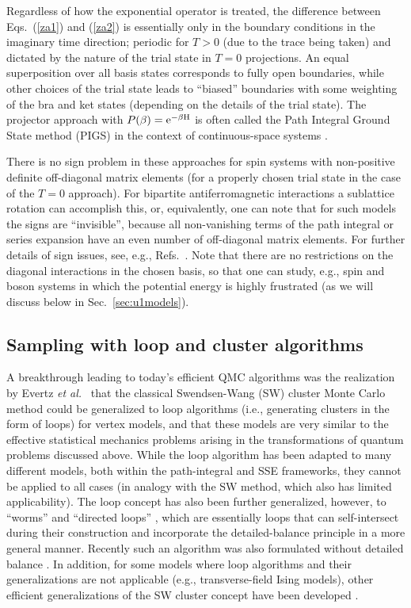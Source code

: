 \documentclass[10pt,pre,aps,twocolumn,showpacs,superscriptaddress,floatfix]{revtex4-1}
\begin{document}
Regardless of how the exponential operator is treated, the difference between Eqs.~(\ref{za1}) and (\ref{za2}) is essentially only in the boundary 
conditions in the imaginary time direction; periodic for $T>0$ (due to the trace being taken) and dictated by the nature of the trial state in $T=0$ 
projections. An equal superposition over all basis states corresponds to fully open boundaries, while other choices of the trial state leads to ``biased''
boundaries with some weighting of the bra and ket states (depending on the details of the trial state). The projector approach with $P(\beta)={\rm e^{-\beta H}}$
is often called the Path Integral Ground State method (PIGS) in the context of continuous-space systems \cite{Sarsa00,Vitali08}.

There is no sign problem in these approaches for spin systems with non-positive definite off-diagonal matrix elements (for a properly chosen trial state in the 
case of the $T=0$ approach). For bipartite antiferromagnetic interactions a sublattice rotation can accomplish this, or, equivalently, one can note that
for such models the signs are ``invisible'', because all non-vanishing terms of the path integral or series expansion have an even number of off-diagonal 
matrix elements. For further details of sign issues, see, e.g., Refs.~\cite{Henelius00,Evertz03,Nyfeler08}. Note that there are no restrictions on the diagonal 
interactions in the chosen basis, so that one can study, e.g., spin and boson systems in which the potential energy is highly frustrated (as we will discuss below 
in Sec.~\ref{sec:u1models}).


\subsection{Sampling with loop and cluster algorithms}

A breakthrough leading to today's efficient QMC algorithms was the realization by Evertz {\it et al.}~\cite{Evertz93} that the classical Swendsen-Wang (SW) cluster 
Monte Carlo method \cite{Swendsen88} could be generalized to loop algorithms (i.e., generating clusters in the form of loops) for vertex models, and that these models 
are very similar to the effective statistical mechanics problems arising in the transformations of quantum problems discussed above. While the loop algorithm has 
been adapted to many different models, both within the path-integral \cite{Kawashima94,Beard96,Harada02,Evertz03} and SSE \cite{Sandvik99} frameworks, they cannot 
be applied to all cases (in analogy with the SW method, which also has limited applicability). The loop concept has also been further generalized, 
however, to ``worms'' \cite{Prokofev96,Prokofev98, WormA} and ``directed loops'' \cite{Sandvik99,Syljuasen02}, which are essentially loops that can self-intersect 
during their construction and incorporate the detailed-balance principle in a more general manner. Recently such 
an algorithm was also formulated without detailed balance \cite{Suwa10}. In addition, for some models where loop algorithms and their generalizations are not 
applicable (e.g., transverse-field Ising models), other efficient generalizations of the SW cluster concept have been developed \cite{Rieger99,Sandvik03}.
\end{document}
